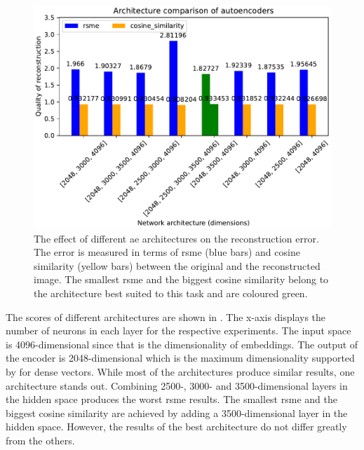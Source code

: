 \begin{figure}[!htp] %
    \centering
    \includegraphics[width=1\textwidth]{images/embeddings/autoencoder/ae_score_plot.pdf}
    \caption[Different \acs*{ae} architectures and their reconstruction error]{The effect of different \acs*{ae} architectures on the reconstruction error.
    The error is measured in terms of \acs*{rsme} (blue bars) and cosine similarity (yellow bars) between the original and the reconstructed image.
    The smallest \acs*{rsme} and the biggest cosine similarity belong to the architecture best suited to this task and are coloured green.
    }
    \label{fig:eval-ae-architecture}
\end{figure}

The scores of different architectures are shown in .
The x-axis displays the number of neurons in each layer for the respective experiments.
The input space is 4096-dimensional since that is the dimensionality of \infersent{} embeddings.
The output of the encoder is 2048-dimensional which is the maximum dimensionality supported by \databaseName{} for dense vectors.
While most of the architectures produce similar results, one architecture stands out.
Combining 2500-, 3000- and 3500-dimensional layers in the hidden space produces the worst \ac{rsme} results.
The smallest \ac{rsme} and the biggest cosine similarity are achieved by adding a 3500-dimensional layer in the hidden space.
However, the results of the best architecture do not differ greatly from the others.